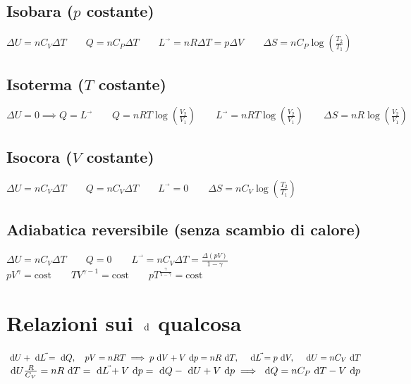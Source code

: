 \documentclass[a4paper,NoNotes,GeneralMath,12pt]{stdmdoc}
\begin{document}
	\subsection*{Isobara ($p$ costante)}
	$\Delta U = n C_V \Delta T \qquad Q = n C_P \Delta T \qquad L^{\vec{}} = nR \Delta T = p \Delta V \qquad \Delta S = n C_P \log \left( \frac{T_2}{T_1} \right)$
	
	\subsection*{Isoterma ($T$ costante)}
	$\Delta U = 0 \implies Q = L^{\vec{}} \qquad Q = nRT \log \left( \frac{V_2}{V_1} \right) \qquad L^{\vec{}} = nRT \log \left( \frac{V_2}{V_1} \right) \qquad \Delta S = nR \log \left( \frac{V_2}{V_1} \right) $

	\subsection*{Isocora ($V$ costante)}
	$\Delta U = n C_V \Delta T \qquad Q = n C_V \Delta T \qquad L^{\vec{}} = 0 \qquad \Delta S = n C_V \log \left( \frac{T_2}{T_1} \right)$

	\subsection*{Adiabatica reversibile (senza scambio di calore)}
	$\Delta U = n C_V \Delta T \qquad Q = 0 \qquad L^{\vec{}} = n C_V \Delta T = \frac{\Delta (pV)}{1 - \gamma}$ \\ $pV^\gamma = \text{cost} \qquad TV^{\gamma -1} = \text{cost} \qquad pT^{\frac{\gamma}{1-\gamma}} = \text{cost}$

	\section*{Relazioni sui $\de$ qualcosa}
	$\de{U} + \de{L^{\vec{}}} = \de{Q}, \quad pV = nRT \implies p\de{V} + V\de{p} = nR\de{T}, \quad \de{L^{\vec{}}} = p\de{V}, \quad \de{U} = nC_V \de{T}$ \\
	$\de{U} \frac{R}{C_V} = nR\de{T} = \de{L^{\vec{}}} + V\de{p} = \de{Q} - \de{U} + V\de{p} \implies \de{Q} = nC_P \de{T} - V\de{p}$
\end{document}
